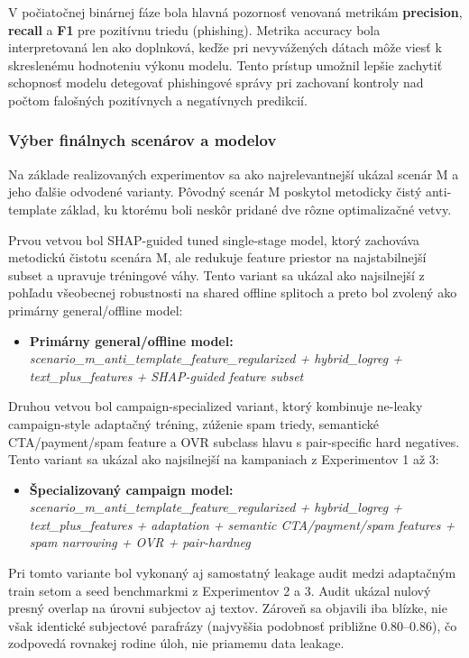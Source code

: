 \documentclass[conference]{IEEEtran}
\begin{document}
V počiatočnej binárnej fáze bola hlavná pozornosť venovaná metrikám \textbf{precision}, \textbf{recall} a \textbf{F1} pre pozitívnu triedu (phishing). Metrika accuracy bola interpretovaná len ako doplnková, keďže pri nevyvážených dátach môže viesť k skreslenému hodnoteniu výkonu modelu. Tento prístup umožnil lepšie zachytiť schopnosť modelu detegovať phishingové správy pri zachovaní kontroly nad počtom falošných pozitívnych a negatívnych predikcií.

\subsubsection{Výber finálnych scenárov a modelov}

Na základe realizovaných experimentov sa ako najrelevantnejší ukázal scenár M a jeho ďalšie odvodené varianty. Pôvodný scenár M poskytol metodicky čistý anti-template základ, ku ktorému boli neskôr pridané dve rôzne optimalizačné vetvy.

Prvou vetvou bol SHAP-guided tuned single-stage model, ktorý zachováva metodickú čistotu scenára M, ale redukuje feature priestor na najstabilnejší subset a upravuje tréningové váhy. Tento variant sa ukázal ako najsilnejší z pohľadu všeobecnej robustnosti na shared offline splitoch a preto bol zvolený ako primárny general/offline model:
\begin{itemize}
    \item \textbf{Primárny general/offline model:} \\
    \textit{scenario\_m\_anti\_template\_feature\_regularized + hybrid\_logreg + text\_plus\_features + SHAP-guided feature subset}
\end{itemize}

Druhou vetvou bol campaign-specialized variant, ktorý kombinuje ne-leaky campaign-style adaptačný tréning, zúženie spam triedy, semantické CTA/payment/spam feature a OVR subclass hlavu s pair-specific hard negatives. Tento variant sa ukázal ako najsilnejší na kampaniach z Experimentov 1 až 3:
\begin{itemize}
    \item \textbf{Špecializovaný campaign model:} \\
    \textit{scenario\_m\_anti\_template\_feature\_regularized + hybrid\_logreg + text\_plus\_features + adaptation + semantic CTA/payment/spam features + spam narrowing + OVR + pair-hardneg}
\end{itemize}

Pri tomto variante bol vykonaný aj samostatný leakage audit medzi adaptačným train setom a seed benchmarkmi z Experimentov 2 a 3. Audit ukázal nulový presný overlap na úrovni subjectov aj textov. Zároveň sa objavili iba blízke, nie však identické subjectové parafrázy (najvyššia podobnosť približne 0.80--0.86), čo zodpovedá rovnakej rodine úloh, nie priamemu data leakage.
\end{document}

